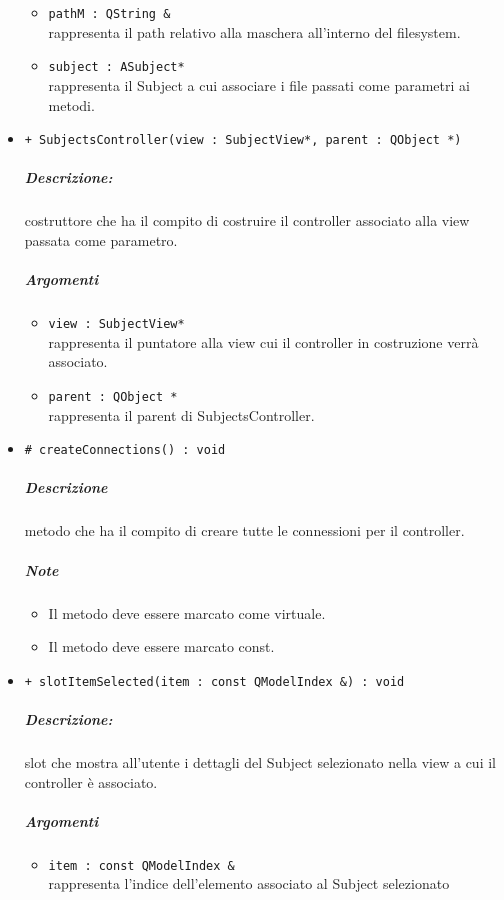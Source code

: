 \begin{itemize}
\begin{itemize}
				\item \color{RoyalPurple} \verb!pathM : QString &!\\				
\color{black} rappresenta il path relativo alla maschera all'interno del filesystem.
				\item \color{RoyalPurple} \verb!subject : ASubject*!\\				
\color{black} rappresenta il Subject\g{} a cui associare i file passati come parametri ai metodi.
			\end{itemize}
			\item \color{blue} \verb!+ SubjectsController(view : SubjectView*, parent : QObject *)!
			\color{black}
			\subparagraph{Descrizione:} costruttore che ha il compito di costruire il controller associato alla view passata come parametro.
			\color{black}
			\subparagraph{Argomenti}
			\begin{itemize}
				\item \color{RoyalPurple} \verb!view : SubjectView*!\\				
\color{black} rappresenta il puntatore alla view cui il controller in costruzione verrà associato.
				\item \color{RoyalPurple} \verb!parent : QObject *!\\				
\color{black} rappresenta il parent di SubjectsController.
			\end{itemize}
			\item \color{blue} \verb!# createConnections() : void!
			\color{black}
			\subparagraph{Descrizione} metodo che ha il compito di creare tutte le connessioni per il controller.
			\subparagraph{Note}
			\begin{itemize}
				\item Il metodo deve essere marcato come virtuale.
				\item Il metodo deve essere marcato const.
			\end{itemize}
			\item \color{blue} \verb!+ slotItemSelected(item : const QModelIndex &) : void!
			\color{black}
			\subparagraph{Descrizione:} slot\g{} che mostra all'utente i dettagli del Subject\g{} selezionato nella view a cui il controller è associato.
			\color{black}
			\subparagraph{Argomenti}
			\begin{itemize}
				\item \color{RoyalPurple} \verb!item : const QModelIndex &!\\				
\color{black} rappresenta l'indice dell'elemento associato al Subject\g{} selezionato
			\end{itemize}

\end{itemize}
